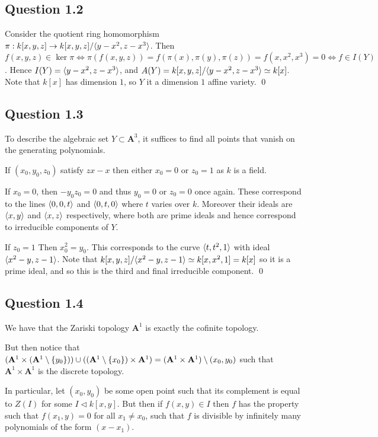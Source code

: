 \documentclass{article}
\begin{document}
\subsection*{Question 1.2}

Consider the quotient ring homomorphism $\pi: k[x,y,z] \to k[x,y,z]/\langle y-x^2,z-x^3\rangle$. Then $f(x,y,z) \in \ker \pi \Longleftrightarrow \pi(f(x,y,z)) = f(\pi(x),\pi(y),\pi(z)) = f(x,x^2,x^3) = 0 \Longleftrightarrow f \in I(Y)$. Hence $I(Y) = \langle y-x^2, z-x^3\rangle$, and $A(Y) = k[x,y,z]/\langle y-x^2, z-x^3\rangle \simeq k[x]$. Note that $k[x]$ has dimension $1$, so $Y$ it a dimension $1$ affine variety. \qed

\subsection*{Question 1.3}

To describe the algebraic set $Y \subset \mathbf A^3$, it suffices to find all points that vanish on the generating polynomials.

If $(x_0,y_0,z_0)$ satisfy $zx-x$ then either $x_0=0$ or $z_0=1$ as $k$ is a field.

If $x_0=0$, then $-y_0z_0=0$ and thus $y_0 = 0$ or $z_0 = 0$ once again. These correspond to the lines $\langle0,0,t\rangle$ and $\langle0,t,0\rangle$ where $t$ varies over $k$. Moreover their ideals are $\langle x,y\rangle$ and $\langle x,z\rangle$ respectively, where both are prime ideals and hence correspond to irreducible components of $Y$.

If $z_0 = 1$ Then $x_0^2 =y_0$. This corresponds to the curve $\langle t,t^2,1\rangle$ with ideal $\langle x^2-y,z-1\rangle$. Note that $k[x,y,z]/\langle x^2-y,z-1\rangle \simeq k[x,x^2,1] = k[x]$ so it is a prime ideal, and so this is the third and final irreducible component. \qed

\subsection*{Question 1.4}

We have that the Zariski topology $\mathbf{A}^1$ is exactly the cofinite topology.

But then notice that $(\mathbf{A}^1\times(\mathbf{A}^1\setminus\{y_0\}))\cup((\mathbf{A}^1\setminus\{x_0\})\times\mathbf{A}^1) =(\mathbf{A}^1\times\mathbf{A}^1)\setminus(x_0,y_0)$ such that $\mathbf{A}^1\times \mathbf{A}^1$ is the discrete topology.

In particular, let $(x_0,y_0)$ be some open point such that its complement is equal to $Z(I)$ for some $I\lhd k[x,y]$. But then if $f(x,y)\in I$ then $f$ has the property such that $f(x_1,y)=0$ for all $x_1\neq x_0$, such that $f$ is divisible by infinitely many polynomials of the form $(x-x_1)$.
\end{document}
